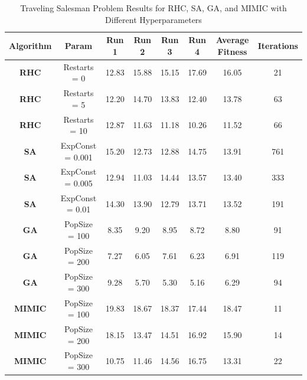 \begin{table}[h!]
    \centering
    \caption{Traveling Salesman Problem Results for RHC, SA, GA, and MIMIC with Different Hyperparameters}
    \begin{tabular}{|c|c|c|c|c|c|c|c|}
        \hline
        \textbf{Algorithm} & \textbf{Param} & \textbf{Run 1} & \textbf{Run 2} & \textbf{Run 3} & \textbf{Run 4} & \textbf{Average Fitness} & \textbf{Iterations} \\ \hline
        
        \textbf{RHC} & Restarts = 0 & 12.83 & 15.88 & 15.15 & 17.69 & 16.05 & 21 \\ \hline
        \textbf{RHC} & Restarts = 5 & 12.20 & 14.70 & 13.83 & 12.40 & 13.78 & 63 \\ \hline
        \textbf{RHC} & Restarts = 10 & 12.87 & 11.63 & 11.18 & 10.26 & 11.52 & 66 \\ \hline
        
        \textbf{SA} & ExpConst = 0.001 & 15.20 & 12.73 & 12.88 & 14.75 & 13.91 & 761 \\ \hline
        \textbf{SA} & ExpConst = 0.005 & 12.94 & 11.03 & 14.44 & 13.57 & 13.40 & 333 \\ \hline
        \textbf{SA} & ExpConst = 0.01 & 14.30 & 13.90 & 12.79 & 13.71 & 13.52 & 191 \\ \hline
        
        \textbf{GA} & PopSize = 100 & 8.35 & 9.20 & 8.95 & 8.72 & 8.80 & 91 \\ \hline
        \textbf{GA} & PopSize = 200 & 7.27 & 6.05 & 7.61 & 6.23 & 6.91 & 119 \\ \hline
        \textbf{GA} & PopSize = 300 & 9.28 & 5.70 & 5.30 & 5.16 & 6.29 & 94 \\ \hline
        
        \textbf{MIMIC} & PopSize = 100 & 19.83 & 18.67 & 18.37 & 17.44 & 18.47 & 11 \\ \hline
        \textbf{MIMIC} & PopSize = 200 & 18.15 & 13.47 & 14.51 & 16.92 & 15.90 & 14 \\ \hline
        \textbf{MIMIC} & PopSize = 300 & 10.75 & 11.46 & 14.56 & 16.75 & 13.31 & 22 \\ \hline
        
    \end{tabular}
    \label{tab:tsp_results}
\end{table}
